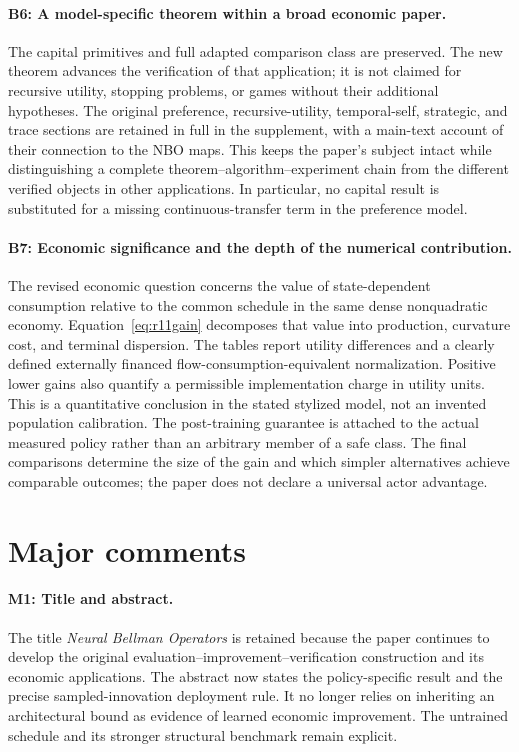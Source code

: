 \paragraph{B6: A model-specific theorem within a broad economic paper.}
The capital primitives and full adapted comparison class are preserved. The new theorem advances the verification of that application; it is not claimed for recursive utility, stopping problems, or games without their additional hypotheses. The original preference, recursive-utility, temporal-self, strategic, and trace sections are retained in full in the supplement, with a main-text account of their connection to the NBO maps. This keeps the paper's subject intact while distinguishing a complete theorem--algorithm--experiment chain from the different verified objects in other applications. In particular, no capital result is substituted for a missing continuous-transfer term in the preference model.

\paragraph{B7: Economic significance and the depth of the numerical contribution.}
The revised economic question concerns the value of state-dependent consumption relative to the common schedule in the same dense nonquadratic economy. Equation~\ref{eq:r11gain} decomposes that value into production, curvature cost, and terminal dispersion. The tables report utility differences and a clearly defined externally financed flow-consumption-equivalent normalization. Positive lower gains also quantify a permissible implementation charge in utility units. This is a quantitative conclusion in the stated stylized model, not an invented population calibration. The post-training guarantee is attached to the actual measured policy rather than an arbitrary member of a safe class. The final comparisons determine the size of the gain and which simpler alternatives achieve comparable outcomes; the paper does not declare a universal actor advantage.

\section*{Major comments}
\paragraph{M1: Title and abstract.}
The title \emph{Neural Bellman Operators} is retained because the paper continues to develop the original evaluation--improvement--verification construction and its economic applications. The abstract now states the policy-specific result and the precise sampled-innovation deployment rule. It no longer relies on inheriting an architectural bound as evidence of learned economic improvement. The untrained schedule and its stronger structural benchmark remain explicit.

